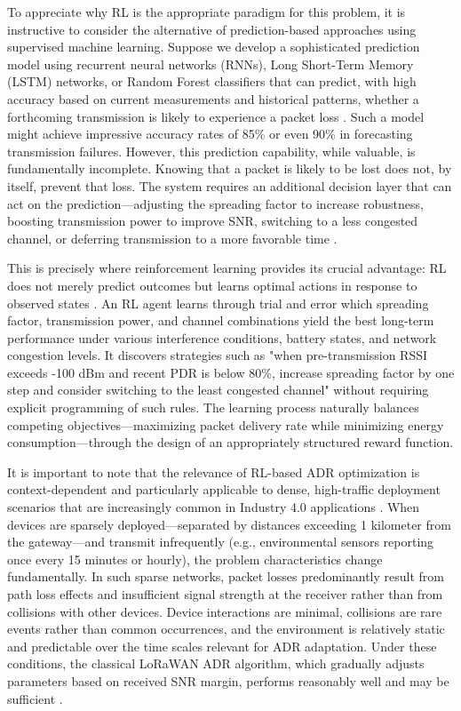 \documentclass[12pt,a4paper]{article}
\begin{document}
To appreciate why RL is the appropriate paradigm for this problem, it is instructive to consider the alternative of prediction-based approaches using supervised machine learning. Suppose we develop a sophisticated prediction model using recurrent neural networks (RNNs), Long Short-Term Memory (LSTM) networks, or Random Forest classifiers that can predict, with high accuracy based on current measurements and historical patterns, whether a forthcoming transmission is likely to experience a packet loss \cite{rizzi2017evaluation}. Such a model might achieve impressive accuracy rates of 85\% or even 90\% in forecasting transmission failures. However, this prediction capability, while valuable, is fundamentally incomplete. Knowing that a packet is likely to be lost does not, by itself, prevent that loss. The system requires an additional decision layer that can act on the prediction—adjusting the spreading factor to increase robustness, boosting transmission power to improve SNR, switching to a less congested channel, or deferring transmission to a more favorable time \cite{abdelfadeel2020machine}.

This is precisely where reinforcement learning provides its crucial advantage: RL does not merely predict outcomes but learns optimal actions in response to observed states \cite{mnih2015human}. An RL agent learns through trial and error which spreading factor, transmission power, and channel combinations yield the best long-term performance under various interference conditions, battery states, and network congestion levels. It discovers strategies such as "when pre-transmission RSSI exceeds -100 dBm and recent PDR is below 80\%, increase spreading factor by one step and consider switching to the least congested channel" without requiring explicit programming of such rules. The learning process naturally balances competing objectives—maximizing packet delivery rate while minimizing energy consumption—through the design of an appropriately structured reward function.

It is important to note that the relevance of RL-based ADR optimization is context-dependent and particularly applicable to dense, high-traffic deployment scenarios that are increasingly common in Industry 4.0 applications \cite{li2018internet}. When devices are sparsely deployed—separated by distances exceeding 1 kilometer from the gateway—and transmit infrequently (e.g., environmental sensors reporting once every 15 minutes or hourly), the problem characteristics change fundamentally. In such sparse networks, packet losses predominantly result from path loss effects and insufficient signal strength at the receiver rather than from collisions with other devices. Device interactions are minimal, collisions are rare events rather than common occurrences, and the environment is relatively static and predictable over the time scales relevant for ADR adaptation. Under these conditions, the classical LoRaWAN ADR algorithm, which gradually adjusts parameters based on received SNR margin, performs reasonably well and may be sufficient \cite{reynders2017power}.
\end{document}
